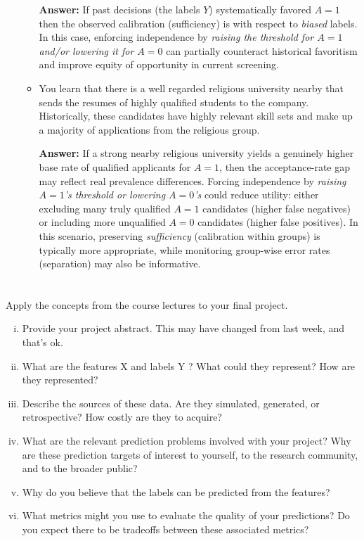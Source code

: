 \documentclass[a4paper]{article}
\begin{document}
\begin{itemize}
\begin{itemize}
                \textbf{Answer: }If past decisions (the labels $Y$) systematically favored $A=1$ then the observed calibration (sufficiency) is with respect to \emph{biased} labels.
    In this case, enforcing independence by \emph{raising the threshold for $A=1$ and/or lowering it for $A=0$} can partially counteract historical favoritism and improve equity of opportunity in current screening.

            \item You learn that there is a well regarded religious university nearby that sends the resumes of highly qualified students to the company. Historically, these candidates have highly relevant skill sets and make up a majority of applications from the religious group.

                \textbf{Answer: }If a strong nearby religious university yields a genuinely higher base rate of qualified applicants for $A=1$, then the acceptance-rate gap may reflect real prevalence differences. Forcing independence by \emph{raising $A=1$’s threshold or lowering $A=0$’s} could reduce utility: either excluding many truly qualified $A=1$ candidates (higher false negatives) or including more unqualified $A=0$ candidates (higher false positives).
    In this scenario, preserving \emph{sufficiency} (calibration within groups) is typically more appropriate, while monitoring group-wise error rates (separation) may also be informative.
        \end{itemize}
\end{itemize}

\section{}
Apply the concepts from the course lectures to your final project.
\begin{enumerate}[(i)]
    \item Provide your project abstract. This may have changed from last week, and that’s ok.
    \item What are the features X and labels Y ? What could they represent? How are they represented?
    \item Describe the sources of these data. Are they simulated, generated, or retrospective? How costly are they to acquire?
    \item What are the relevant prediction problems involved with your project? Why are these prediction targets of interest to yourself, to the research community, and to the broader public?
    \item Why do you believe that the labels can be predicted from the features?
    \item What metrics might you use to evaluate the quality of your predictions? Do you expect there to be tradeoffs between these associated metrics?
\end{enumerate}
\end{document}
